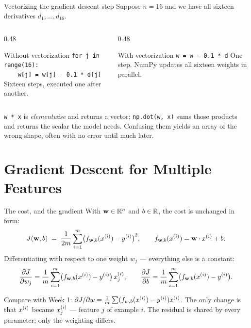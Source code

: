 \documentclass[aspectratio=169,10pt]{beamer}
\begin{document}
\begin{frame}{Vectorizing the gradient descent step}
  \footnotesize
  Suppose $n=16$ and we have all sixteen derivatives $d_1,\dots,d_{16}$.
  \vspace{1mm}
  \begin{columns}[T,onlytextwidth]
    \begin{column}{0.48\textwidth}
      \begin{block}{Without vectorization}
        \texttt{for j in range(16):}\\
        \texttt{\ \ \ \ w[j] = w[j] - 0.1 * d[j]}
        \vspace{1mm}
        Sixteen steps, executed one after another.
      \end{block}
    \end{column}
    \begin{column}{0.48\textwidth}
      \begin{block}{With vectorization}
        \texttt{w = w - 0.1 * d}
        \vspace{1mm}
        One step. NumPy updates all sixteen weights in parallel.
      \end{block}
    \end{column}
  \end{columns}
  \begin{pitfall}
    \small
    \texttt{w * x} is \emph{elementwise} and returns a vector; \texttt{np.dot(w, x)} sums
    those products and returns the scalar the model needs. Confusing them yields an array of
    the wrong shape, often with no error until much later.
  \end{pitfall}
\end{frame}

\section{Gradient Descent for Multiple Features}

\begin{frame}{The cost, and the gradient}
  With $\mathbf{w}\in\mathbb{R}^n$ and $b\in\mathbb{R}$, the cost is unchanged in form:
  \[
    J(\mathbf{w},b) \;=\; \frac{1}{2m}\sum_{i=1}^{m}\bigl(f_{\mathbf{w},b}(x^{(i)})-y^{(i)}\bigr)^{2},
    \qquad f_{\mathbf{w},b}(x^{(i)}) = \mathbf{w}\cdot x^{(i)}+b .
  \]
  Differentiating with respect to one weight $w_j$ --- everything else is a constant:
  \[
    \frac{\partial J}{\partial w_j}
      = \frac{1}{m}\sum_{i=1}^{m}\bigl(f_{\mathbf{w},b}(x^{(i)})-y^{(i)}\bigr)\,x^{(i)}_{j},
    \qquad
    \frac{\partial J}{\partial b}
      = \frac{1}{m}\sum_{i=1}^{m}\bigl(f_{\mathbf{w},b}(x^{(i)})-y^{(i)}\bigr).
  \]
  \begin{keyidea}
    Compare with Week 1: $\partial J/\partial w = \frac1m\sum(f_{w,b}(x^{(i)})-y^{(i)})x^{(i)}$.
    The only change is that $x^{(i)}$ became $x^{(i)}_{j}$ --- feature $j$ of example $i$.
    The residual is shared by every parameter; only the weighting differs.
  \end{keyidea}
\end{frame}
\end{document}
